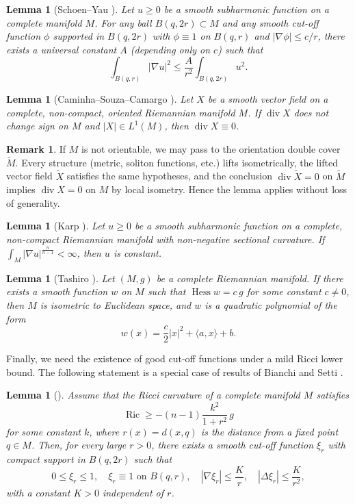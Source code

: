 \documentclass[12pt,a4paper]{article}
\newcommand{\Ric}{\operatorname{Ric}}
\newcommand{\Hess}{\operatorname{Hess}}
\newcommand{\divg}{\operatorname{div}}
\newtheorem{lemma}[theorem]{Lemma}
\theoremstyle{definition}
\newtheorem{remark}[theorem]{Remark}
\theoremstyle{definition}
\begin{document}
\begin{lemma}[Schoen--Yau \cite{SchoenYau}]\label{lem:SY}
Let $u\ge 0$ be a smooth subharmonic function on a complete manifold $M$.
For any ball $B(q,2r)\subset M$ and any smooth cut-off function $\phi$ supported in $B(q,2r)$ with $\phi\equiv 1$ on $B(q,r)$ and $|\nabla\phi|\le c/r$, there exists a universal constant $A$ (depending only on $c$) such that
\[
\int_{B(q,r)}|\nabla u|^2 \le \frac{A}{r^2}\int_{B(q,2r)} u^2.
\]
\end{lemma}

\begin{lemma}[Caminha--Souza--Camargo \cite{Caminha}]\label{lem:CSC}
Let $X$ be a smooth vector field on a complete, non-compact, oriented Riemannian manifold $M$.
If $\divg X$ does not change sign on $M$ and $|X|\in L^1(M)$, then $\divg X\equiv 0$.
\end{lemma}
\begin{remark}
If $M$ is not orientable, we may pass to the orientation double cover $\widetilde M$.
Every structure (metric, soliton functions, etc.) lifts isometrically, the lifted vector field $\widetilde X$ satisfies the same hypotheses, and the conclusion $\divg \widetilde X=0$ on $\widetilde M$ implies $\divg X=0$ on $M$ by local isometry.
Hence the lemma applies without loss of generality.
\end{remark}

\begin{lemma}[Karp \cite{Karp}]\label{lem:Karp}
Let $u\ge 0$ be a smooth subharmonic function on a complete, non-compact Riemannian manifold with non-negative sectional curvature.
If $\int_M |\nabla u|^{\frac{n}{n-1}} < \infty$, then $u$ is constant.
\end{lemma}

\begin{lemma}[Tashiro \cite{Tashiro}]\label{lem:Tashiro}
Let $(M,g)$ be a complete Riemannian manifold.
If there exists a smooth function $w$ on $M$ such that $\Hess w = c\,g$ for some constant $c\neq 0$, then $M$ is isometric to Euclidean space, and $w$ is a quadratic polynomial of the form
\[
w(x) = \frac{c}{2}|x|^2 + \langle a, x\rangle + b.
\]
\end{lemma}

Finally, we need the existence of good cut-off functions under a mild Ricci lower bound.
The following statement is a special case of results of Bianchi and Setti \cite{Bianchi}.

\begin{lemma}[{\cite[Corollary 2.3]{Bianchi}}]\label{lem:Bianchi}
Assume that the Ricci curvature of a complete manifold $M$ satisfies
\[
\Ric \ge -(n-1)\frac{k^2}{1+r^2}\, g
\]
for some constant $k$, where $r(x)=d(x,q)$ is the distance from a fixed point $q\in M$.
Then, for every large $r>0$, there exists a smooth cut-off function $\xi_r$ with compact support in $B(q,2r)$ such that
\[
0\le \xi_r\le 1,\quad \xi_r\equiv 1 \text{ on } B(q,r),\quad
|\nabla\xi_r|\le \frac{K}{r},\quad |\Delta\xi_r|\le \frac{K}{r^2},
\]
with a constant $K>0$ independent of $r$.
\end{lemma}
\end{document}
